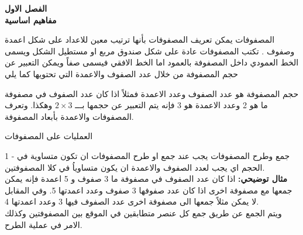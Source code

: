 	\begin{frame}
		\begin{center}
			\Huge
			\textbf{الفصل الاول}\\
			\textbf{مفاهيم اساسية}
		\end{center}
	\end{frame}
	
	\begin{frame}
		\begin{exampleblock}{المصفوفات}
			يمكن تعريف المصفوفات بأنها ترتيب معين للاعداد على شكل اعمدة وصفوف . تكتب المصفوفات عادة على شكل صندوق مربع او مستطيل الشكل ويسمى الخط العمودي داخل المصفوفة بالعمود اما الخط الافقي فيسمى صفاً ويمكن التعبير عن حجم المصفوفة من خلال عدد الصفوف والاعمدة التي تحتويها كما يلي
		\end{exampleblock}
		
		\begin{exampleblock}{حجم المصفوفة}
			هو عدد الصفوف وعدد الاعمدة فمثلاً اذا كان عدد الصفوف في مصفوفة ما هو 2 وعدد الاعمدة هو 3 فإنه يتم التعبير عن حجمها بـــ $2\times3$ وهكذا. وتعرف المصفوفات والاعمدة بأبعاد المصفوفة.
		\end{exampleblock}
	\end{frame}
	
	\begin{frame}{العمليات على المصفوفات}
		\begin{exampleblock}{1 - جمع وطرح المصفوفات}
			يجب عند جمع او طرح المصفوفات ان تكون متساوية في الحجم اي يجب لعدد الصفوف والاعمدة ان يكون متساوياُ في كلا المصفوفتين.\\
			\noindent
			\textbf{مثال توضيحي:} اذا كان عدد الصفوف في مصفوفة ما 3 صفوف و 5 اعمدة فإنه يمكن جمعها مع مصفوفة اخرى اذا كان عدد صفوفها 3 صفوف وعدد اعمدتها 5. وفي المقابل لا يمكن مثلاً جمعها الى مصفوفة اخرى عدد الصفوف فيها 3 وعدد اعمدتها 4.\\
			ويتم الجمع عن طريق جمع كل عنصر متطابقين في الموقع بين المصفوفتين وكذلك الامر في عملية الطرح.
		\end{exampleblock}
	\end{frame}
	
